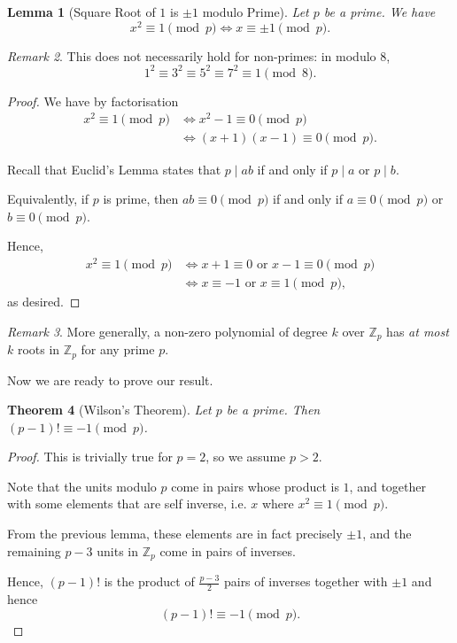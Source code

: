 \documentclass{article}
\newtheorem{theorem}{Theorem}[section]
\newtheorem{lemma}[theorem]{Lemma}
\theoremstyle{definition}
\theoremstyle{remark}
\newtheorem{remark}[theorem]{Remark}
\newcommand{\pqty}[1]{\left(#1\right)}
\newcommand{\divides}{\mid}
\newcommand{\ZZ}{\mathbb{Z}}
\begin{document}
\begin{lemma}[Square Root of \(1\) is \(\pm 1\) modulo Prime]
    Let \(p\) be a prime. We have
    \[
        x^2 \equiv 1 \pmod{p} \iff x \equiv \pm 1 \pmod{p}.
    \]
\end{lemma}

\begin{remark}
    This does not necessarily hold for non-primes: in modulo \(8\),
    \[
        1^2 \equiv 3^2 \equiv 5^2 \equiv 7^2 \equiv 1 \pmod{8}.
    \]
\end{remark}

\begin{proof}
    We have by factorisation
    \begin{align*}
        x^2 \equiv 1 \pmod{p} &\iff x^2 - 1 \equiv 0 \pmod{p} \\
        &\iff \pqty{x + 1} \pqty{x - 1} \equiv 0 \pmod{p}.
    \end{align*}

    Recall that Euclid's Lemma states that \(p \divides ab\) if and only if \(p \divides a\) or \(p \divides b\).

    Equivalently, if \(p\) is prime, then \(ab \equiv 0 \pmod{p}\) if and only if \(a \equiv 0 \pmod{p}\) or \(b \equiv 0 \pmod{p}\).

    Hence,
    \begin{align*}
        x^2 \equiv 1 \pmod{p} &\iff x + 1 \equiv 0 \text{ or } x - 1 \equiv 0 \pmod{p} \\
        &\iff x \equiv -1 \text{ or } x \equiv 1 \pmod{p},
    \end{align*}
    as desired.
\end{proof}

\begin{remark}
    More generally, a non-zero polynomial of degree \(k\) over \(\ZZ_p\) has \emph{at most} \(k\) roots in \(\ZZ_p\) for any prime \(p\).
\end{remark}

Now we are ready to prove our result.

\begin{theorem}[Wilson's Theorem]
    Let \(p\) be a prime. Then \(\pqty{p - 1}! \equiv -1 \pmod{p}\).
\end{theorem}

\begin{proof}
    This is trivially true for \(p = 2\), so we assume \(p > 2\).

    Note that the units modulo \(p\) come in pairs whose product is \(1\), and together with some elements that are self inverse, i.e. \(x\) where \(x^2 \equiv 1 \pmod{p}\).

    From the previous lemma, these elements are in fact precisely \(\pm 1\), and the remaining \(p - 3\) units in \(\ZZ_p\) come in pairs of inverses.

    Hence, \(\pqty{p - 1}!\) is the product of \(\frac{p - 3}{2}\) pairs of inverses together with \(\pm 1\) and hence
    \[
        \pqty{p - 1}! \equiv -1 \pmod{p}.
    \]
\end{proof}
\end{document}
